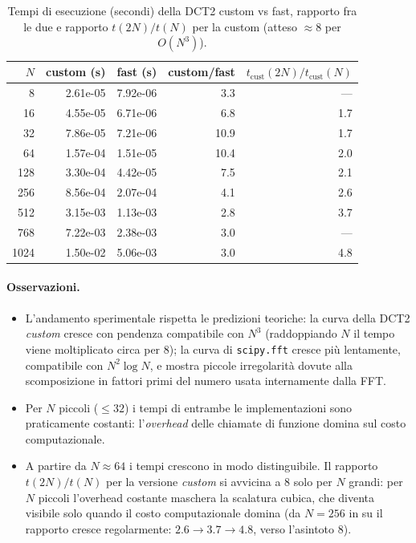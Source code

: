 \documentclass[11pt,a4paper]{article}
\begin{document}
\begin{table}[H]
\centering
\caption{Tempi di esecuzione (secondi) della DCT2 custom vs fast, rapporto fra
le due e rapporto $t(2N)/t(N)$ per la custom (atteso $\approx 8$ per $O(N^3)$).}
\label{tab:tempi}
\begin{tabular}{rrrrr}
\toprule
$N$ & custom (s) & fast (s) & custom/fast & $t_{\text{cust}}(2N)/t_{\text{cust}}(N)$ \\
\midrule
8    & 2.61e-05 & 7.92e-06 & 3.3  & --- \\
16   & 4.55e-05 & 6.71e-06 & 6.8  & 1.7 \\
32   & 7.86e-05 & 7.21e-06 & 10.9 & 1.7 \\
64   & 1.57e-04 & 1.51e-05 & 10.4 & 2.0 \\
128  & 3.30e-04 & 4.42e-05 & 7.5  & 2.1 \\
256  & 8.56e-04 & 2.07e-04 & 4.1  & 2.6 \\
512  & 3.15e-03 & 1.13e-03 & 2.8  & 3.7 \\
768  & 7.22e-03 & 2.38e-03 & 3.0  & --- \\
1024 & 1.50e-02 & 5.06e-03 & 3.0  & 4.8 \\
\bottomrule
\end{tabular}
\end{table}

\paragraph{Osservazioni.}
\begin{itemize}
  \item L'andamento sperimentale rispetta le predizioni teoriche: la curva
        della DCT2 \emph{custom} cresce con pendenza compatibile con $N^3$
        (raddoppiando $N$ il tempo viene moltiplicato circa per $8$); la curva
        di \texttt{scipy.fft} cresce più lentamente, compatibile con
        $N^2\log N$, e mostra piccole irregolarità dovute alla scomposizione in
        fattori primi del numero usata internamente dalla FFT.
  \item Per $N$ piccoli ($\le 32$) i tempi di entrambe le implementazioni sono
        praticamente costanti: l'\emph{overhead} delle chiamate di funzione
        domina sul costo computazionale.
  \item A partire da $N\approx 64$ i tempi crescono in modo distinguibile. Il
        rapporto $t(2N)/t(N)$ per la versione \emph{custom} si avvicina a $8$
        solo per $N$ grandi: per $N$ piccoli l'overhead costante maschera la
        scalatura cubica, che diventa visibile solo quando il costo
        computazionale domina (da $N=256$ in su il rapporto cresce
        regolarmente: $2.6\to3.7\to4.8$, verso l'asintoto $8$).
\end{itemize}
\end{document}
